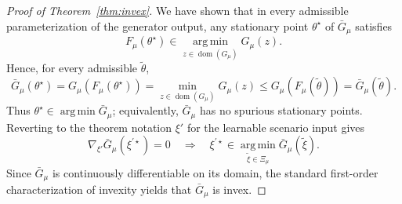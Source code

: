 \documentclass{article}
\theoremstyle{plain}
\theoremstyle{definition}
\theoremstyle{remark}
\begin{document}
\begin{proof}[Proof of Theorem~\ref{thm:invex}]
We have shown that in every admissible parameterization of the generator output, any stationary point \(\theta^\star\) of \(\bar G_\mu\) satisfies
\[
F_\mu(\theta^\star)\in \operatorname*{arg\,min}_{z\in\operatorname{dom}(G_\mu)} G_\mu(z).
\]
Hence, for every admissible \(\tilde\theta\),
\[
\bar G_\mu(\theta^\star)
=
G_\mu(F_\mu(\theta^\star))
=
\min_{z\in\operatorname{dom}(G_\mu)} G_\mu(z)
\le
G_\mu(F_\mu(\tilde\theta))
=
\bar G_\mu(\tilde\theta).
\]
Thus \(\theta^\star\in \operatorname*{arg\,min}\bar G_\mu\); equivalently, \(\bar G_\mu\) has no spurious stationary points. Reverting to the theorem notation \(\xi'\) for the learnable scenario input gives
\[
\nabla_{\xi'}\bar G_\mu(\xi^{\prime\star})=0
\quad\Longrightarrow\quad
\xi^{\prime\star}\in \operatorname*{arg\,min}_{\tilde\xi\in\Xi_\mu}\bar G_\mu(\tilde\xi).
\]
Since \(\bar G_\mu\) is continuously differentiable on its domain, the standard first-order characterization of invexity yields that \(\bar G_\mu\) is invex.
\end{proof}
\end{document}
